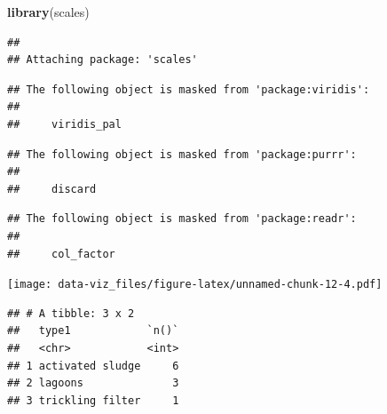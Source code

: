 \documentclass[
]{article}
\newenvironment{Shaded}{\begin{snugshade}}{\end{snugshade}}
\newcommand{\DataTypeTok}[1]{\textcolor[rgb]{0.13,0.29,0.53}{#1}}
\newcommand{\KeywordTok}[1]{\textcolor[rgb]{0.13,0.29,0.53}{\textbf{#1}}}
\newcommand{\NormalTok}[1]{#1}
\newcommand{\OperatorTok}[1]{\textcolor[rgb]{0.81,0.36,0.00}{\textbf{#1}}}
\newcommand{\OtherTok}[1]{\textcolor[rgb]{0.56,0.35,0.01}{#1}}
\newcommand{\StringTok}[1]{\textcolor[rgb]{0.31,0.60,0.02}{#1}}
\begin{document}
\begin{Shaded}
\begin{Highlighting}[]
\KeywordTok{library}\NormalTok{(scales)}
\end{Highlighting}
\end{Shaded}

\begin{verbatim}
## 
## Attaching package: 'scales'
\end{verbatim}

\begin{verbatim}
## The following object is masked from 'package:viridis':
## 
##     viridis_pal
\end{verbatim}

\begin{verbatim}
## The following object is masked from 'package:purrr':
## 
##     discard
\end{verbatim}

\begin{verbatim}
## The following object is masked from 'package:readr':
## 
##     col_factor
\end{verbatim}

\begin{Shaded}
\end{Shaded}

\texttt{[image: data-viz\_files/figure-latex/unnamed-chunk-12-4.pdf]}

\begin{Shaded}
\end{Shaded}

\begin{verbatim}
## # A tibble: 3 x 2
##   type1            `n()`
##   <chr>            <int>
## 1 activated sludge     6
## 2 lagoons              3
## 3 trickling filter     1
\end{verbatim}
\end{document}
